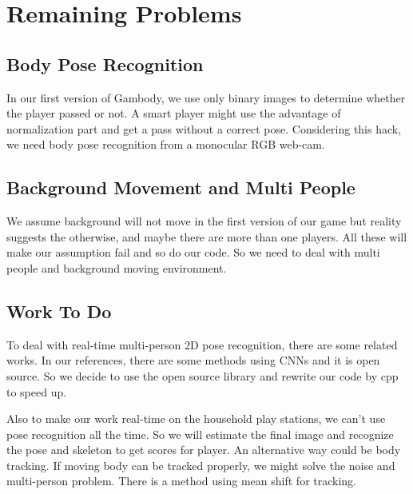 \documentclass[conference,compsoc]{IEEEtran}
\begin{document}
\section{Remaining Problems}
	\subsection{Body Pose Recognition}
		In our first version of Gambody, we use only binary images to determine whether the player passed or not.
		A smart player might use the advantage of normalization part and get a pass without a correct pose.
		Considering this hack, we need body pose recognition from a monocular RGB web-cam.
	\subsection{Background Movement and Multi People}
		We assume background will not move in the first version of our game but reality suggests the otherwise, and maybe there are more than one players.
		All these will make our assumption fail and so do our code. So we need to deal with multi people and background moving environment.\par
	\subsection{Work To Do}
		To deal with real-time multi-person 2D pose recognition, there are some related works.
		In our references, there are some methods using CNNs and it is open source.
		So we decide to use the open source library and rewrite our code by cpp to speed up.\par
		Also to make our work real-time on the household play stations, we can't use pose recognition all the time. So we will estimate the final image and recognize the pose and skeleton to get scores for player.\cite{cao2017realtime}\cite{wei2016cpm}
		An alternative way could be body tracking. If moving body can be tracked properly, we might solve the noise and multi-person problem. There is a method using mean shift for tracking. \cite{Comaniciu2000}




\end{document}
